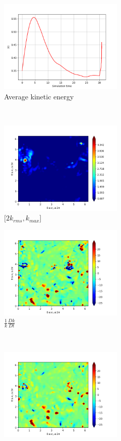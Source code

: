 \begin{figure}[H]
    \begin{subfigure}[H]{0.45\textwidth}
        \includegraphics[height=1.75in]{media/run-cds-65/ke-average1420.png}
        \caption{Average kinetic energy}
    \end{subfigure}
    ~
    \begin{subfigure}[H]{0.45\textwidth}
        \includegraphics[height=1.75in]{media/run-cds-65/ke-2-1420.png}
        \caption{$[2k_{rms}, k_{max} $] }
    \end{subfigure}
    \newline
    \begin{subfigure}[H]{0.45\textwidth}
        \includegraphics[height=1.75in]{media/run-cds-65/ke-1420.png}
        \caption{$\frac{1}{k} \frac{D k}{Dt}$}
    \end{subfigure}
    ~
    \begin{subfigure}{0.45\textwidth}
        \includegraphics[height=1.75in]{media/run-cds-65/A-ke-1420.png}

\end{subfigure}
\end{figure}
